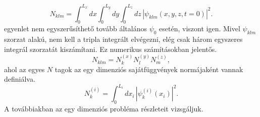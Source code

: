 \begin{equation}
	N_{klm} = \int_0^{L_x}dx\int_0^{L_y}dy\int_0^{L_z}dz\,|\psi_{klm}(x,y,z,t=0)|^2.
	\label{3dbox:3norm}
\end{equation}
 egyenlet nem egyszerűsíthető tovább általános $\psi_0$ esetén, viszont  igen. Mivel $\psi_{klm}$ szorzat alakú, nem kell a tripla integrált elvégezni, elég csak három egyszeres integrál szorzatát kiszámítani. Ez numerikus számításokban jelentős.
\begin{equation}
	N_{klm} = N^{(x)}_kN^{(y)}_lN^{(z)}_m,
\end{equation}
ahol az egyes $N$ tagok az egy dimenziós sajátfüggvények normájaként vannak definiálva.
\begin{equation}
	N^{(i)}_k = \int_0^{L_i}dx_i\,\left|\psi^{(i)}_k(x_i)\right|^2.
\end{equation}
A továbbiakban az egy dimenziós probléma részleteit vizsgáljuk.

%    
%    
